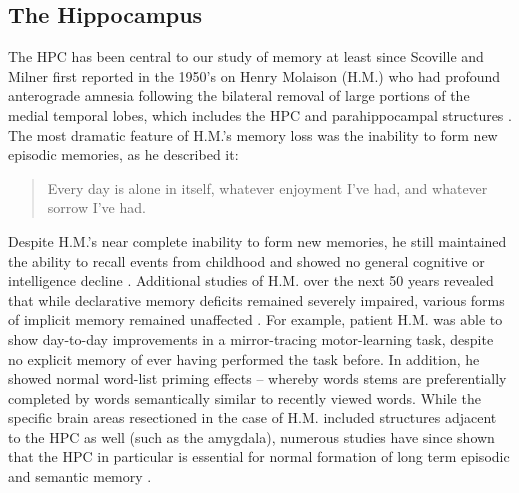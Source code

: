 \subsection{The Hippocampus}
\label{sec:intro:memory:hpc}
The \ac{HPC} has been central to our study of memory at least since Scoville and Milner first reported in the 1950's on Henry Molaison (H.M.) who had profound anterograde amnesia following the bilateral removal of large portions of the medial temporal lobes, which includes the \ac{HPC} and parahippocampal structures \citep{Scoville1957}.
The most dramatic feature of H.M.'s memory loss was the inability to form new episodic memories, as he described it:
\begin{quote}
Every day is alone in itself, whatever enjoyment I've had, and whatever sorrow I've had.
\end{quote}
Despite H.M.'s near complete inability to form new memories, he still maintained the ability to recall events from childhood and showed no general cognitive or intelligence decline \citep{Squire2009}.
Additional studies of H.M. over the next 50 years revealed that while declarative memory deficits remained severely impaired, various forms of implicit memory remained unaffected \citep{Corkin2002}.
For example, patient H.M. was able to show day-to-day improvements in a mirror-tracing motor-learning task, despite no explicit memory of ever having performed the task before.
In addition, he showed normal word-list priming effects -- whereby words stems are preferentially completed by words semantically similar to recently viewed words. 
While the specific brain areas resectioned in the case of H.M. included structures adjacent to the \ac{HPC} as well (such as the amygdala), numerous studies have since shown that the \ac{HPC} in particular is essential for normal formation of long term episodic and semantic memory \citep[reviewed in][]{Eichenbaum2000, Burgess2002}.

